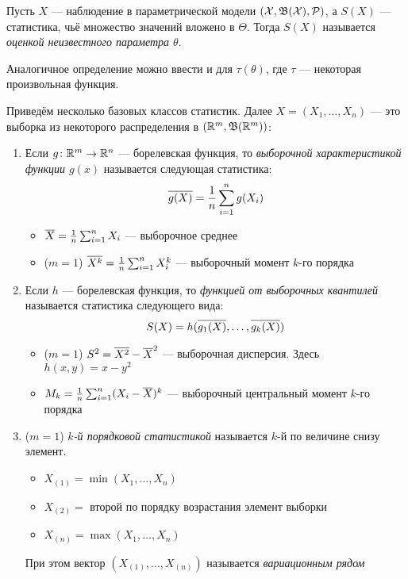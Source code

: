 \begin{definition}
	Пусть $X$ --- наблюдение в параметрической модели $(\mathcal{X}, \mathfrak{B}(\mathcal{X}), \mathcal{P})$, а $S(X)$ --- статистика, чьё множество значений вложено в $\Theta$. Тогда $S(X)$ называется \textit{оценкой неизвестного параметра $\theta$}.
\end{definition}

\begin{note}
	Аналогичное определение можно ввести и для $\tau(\theta)$, где $\tau$ --- некоторая произвольная функция.
\end{note}

\begin{example}
	Приведём несколько базовых классов статистик. Далее $X = (X_1, \ldots, X_n)$ --- это выборка из некоторого распределения в $(\mathbb{R}^m, \mathfrak{B}(\mathbb{R}^m))$:
	\begin{enumerate}
		\item Если $g \colon \mathbb{R}^m \to \mathbb{R}^n$ --- борелевская функция, то \textit{выборочной характеристикой функции $g(x)$} называется следующая статистика:
		\[
			\overline{g(X)} = \frac{1}{n} \sum_{i = 1}^n g(X_i)
		\]
		\begin{itemize}
			\item $\overline{X} = \frac{1}{n} \sum_{i = 1}^n X_i$ --- выборочное среднее
			
			\item ($m = 1$) $\overline{X^k} = \frac{1}{n} \sum_{i = 1}^n X_i^k$ --- выборочный момент $k$-го порядка
		\end{itemize}
		
		\item Если $h$ --- борелевская функция, то \textit{функцией от выборочных квантилей} называется статистика следующего вида:
		\[
			S(X) = h(\overline{g_1(X)}, \ldots, \overline{g_k(X)})
		\]
		\begin{itemize}
			\item ($m = 1$) $S^2 = \overline{X^2} - \overline{X}^2$ --- выборочная дисперсия. Здесь $h(x, y) = x - y^2$
			
			\item $M_k = \frac{1}{n} \sum_{i = 1}^n (X_i - \overline{X})^k$ --- выборочный центральный момент $k$-го порядка
		\end{itemize}
	
		\item ($m = 1$) \textit{$k$-й порядковой статистикой} называется $k$-й по величине снизу элемент.
		\begin{itemize}
			\item $X_{(1)} = \min(X_1, \ldots, X_n)$
			
			\item $X_{(2)} =$ второй по порядку возрастания элемент выборки
			
			\item $X_{(n)} = \max(X_1, \ldots, X_n)$
		\end{itemize}
		При этом вектор $(X_{(1)}, \ldots, X_{(n)})$ называется \textit{вариационным рядом}
	\end{enumerate}
\end{example}

